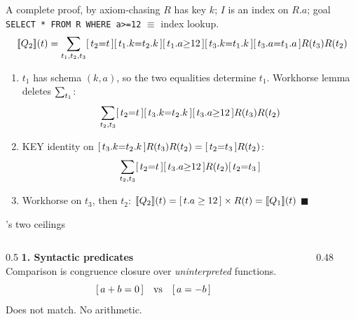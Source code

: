 \documentclass[9pt,aspectratio=169]{beamer}
\begin{document}
\begin{frame}[fragile]{A complete proof, by axiom-chasing}
\small $R$ has key $k$; $I$ is an index on $R.a$; goal
\texttt{SELECT * FROM R WHERE a>=12} $\equiv$ index lookup.
\[[\![ Q_2 ]\!](t)=\sum_{t_1,t_2,t_3}[\,t_2{=}t\,][\,t_1.k{=}t_2.k\,][\,t_1.a{\ge}12\,]
[\,t_3.k{=}t_1.k\,][\,t_3.a{=}t_1.a\,]R(t_3)R(t_2)\]
\begin{enumerate}
\item<2-> $t_1$ has schema $(k,a)$, so the two equalities \alert{determine $t_1$}. Workhorse
      lemma deletes $\sum_{t_1}$:
      \[\sum_{t_2,t_3}[\,t_2{=}t\,][\,t_3.k{=}t_2.k\,][\,t_3.a{\ge}12\,]R(t_3)R(t_2)\]
\item<3-> \alert{KEY identity} on $[\,t_3.k{=}t_2.k\,]R(t_3)R(t_2)=[\,t_2{=}t_3\,]R(t_2)$:
      \[\sum_{t_2,t_3}[\,t_2{=}t\,][\,t_3.a{\ge}12\,]R(t_2)[\,t_2{=}t_3\,]\]
\item<4-> Workhorse on $t_3$, then $t_2$: \quad
      $[\![ Q_2 ]\!](t)=[\,t.a\ge12\,]\times R(t)=[\![ Q_1 ]\!](t)$ \hfill$\blacksquare$
\end{enumerate}
\end{frame}

\begin{frame}[fragile]{\udp{}'s two ceilings}
\begin{columns}[T]
\begin{column}{0.5\textwidth}
\textbf{1. Syntactic predicates}\\[4pt]
Comparison is congruence closure over \emph{uninterpreted} functions.
\[[\,a+b=0\,] \quad\text{vs}\quad [\,a=-b\,]\]
\alert{Does not match.} No arithmetic.\\[4pt]
\end{column}
\begin{column}{0.48\textwidth}
\end{column}
\end{columns}
\vspace{3mm}
\end{frame}
\end{document}
